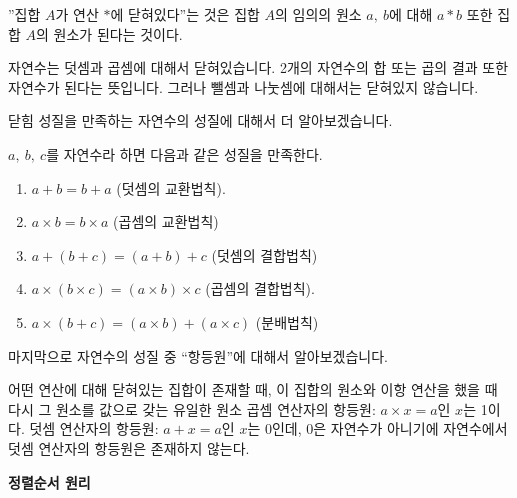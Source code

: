 \begin{tcolorbox}[colback = white, colframe = Theorem, title = \textmd{정리: 닫힘 성질}]
    ”집합 $A$가 연산 $*$에 닫혀있다”는 것은 집합 $A$의 임의의 원소 $a, \ b$에 대해 $a * b$ 또한 집합 $A$의 원소가 된다는 것이다.
\end{tcolorbox}

\begin{flushleft}
    자연수는 덧셈과 곱셈에 대해서 닫혀있습니다. 2개의 자연수의 합 또는 곱의 결과 또한 자연수가 된다는 뜻입니다. 그러나 뺄셈과 나눗셈에 대해서는 닫혀있지 않습니다. 

    \bigskip
    닫힘 성질을 만족하는 자연수의 성질에 대해서 더 알아보겠습니다.
\end{flushleft}

\begin{tcolorbox}[colback = white, colframe = Theorem, title = \textmd{정리: 자연수에 대한 성질}]
    $a, \ b, \ c$를 자연수라 하면 다음과 같은 성질을 만족한다.
    \begin{enumerate}
        \item $a + b= b + a$    (덧셈의 교환법칙).
        \item $a \times b = b \times a$    (곱셈의 교환법칙)
        \item $a + (b + c) = (a + b) +c$    (덧셈의 결합법칙)
        \item $a \times (b \times c) = (a \times b) \times c$    (곱셈의 결합법칙).
        \item $a \times (b + c) = (a \times b) + (a \times c)$    (분배법칙)
    \end{enumerate}
\end{tcolorbox}

\newpage

\begin{flushleft}
    마지막으로 자연수의 성질 중 “항등원”에 대해서 알아보겠습니다.
\end{flushleft}

\begin{tcolorbox}[colback = white, colframe = Definition, title = \textmd{정의: 항등원}]
    어떤 연산에 대해 닫혀있는 집합이 존재할 때, 이 집합의 원소와 이항 연산을 했을 때 다시 그 원소를 값으로 갖는 유일한 원소 
    \bigskip
    곱셈 연산자의 항등원: $a \times x = a$인 $x$는 1이다.
    덧셈 연산자의 항등원: $a + x = a$인 $x$는 0인데, 0은 자연수가 아니기에 자연수에서 덧셈 연산자의 항등원은 존재하지 않는다.
\end{tcolorbox}

\bigskip
\begin{flushleft}
    {\textcolor{subheader}{{\LARGE\textbf{정렬순서 원리}}}}
\end{flushleft}

